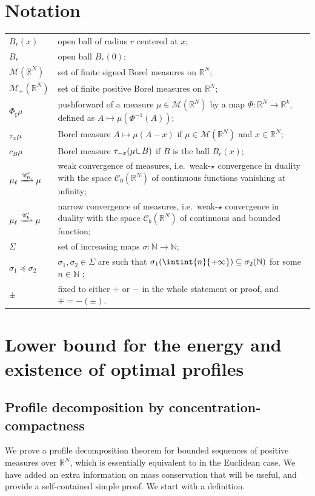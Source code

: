 \documentclass[11pt]{article}
\providecommand{\ie}{i.e.\ }
\theoremstyle{plain}
\theoremstyle{definition}
\newcommand{\N}{\mathbb{N}}
\newcommand{\R}{\mathbb{R}}
\newcommand{\Cspace}{\mathscr{C}}
\newcommand{\Mspace}{\mathscr{M}}
\newcommand{\mres}{\mathop{\hbox{\vrule height 6pt width .5pt depth 0pt \vrule height .5pt width 4pt depth 0pt}}\nolimits}
\newcommand{\mweakto}{\xrightharpoonup{\Cspace_0'}}
\newcommand{\narrowto}{\xrightharpoonup{\Cspace_b'}}
\numberwithin{equation}{section}
\begin{document}
\section*{Notation}
\begin{tabu} {X[2,c,m] X[12,l,p]}
\(B_r(x)\) & open ball of radius \(r\) centered at \(x\);\\
\(B_r\) & open ball $B_r(0)$;\\
\(\Mspace(\R^N)\) & set of finite signed Borel measures on \(\R^N\);\\
\(\Mspace_+(\R^N)\) & set of finite positive Borel measures on \(\R^N\);\\
$\Phi_\sharp\mu$ & pushforward of a measure $\mu\in\Mspace(\R^N)$ by a map $\Phi:\R^N\to\R^k$, defined as $A\mapsto \mu(\Phi^{-1}(A))$;\\
$\tau_x\mu$ & Borel measure $A \mapsto \mu(A-x)$ if \(\mu\in\Mspace(\R^N)\) and $x\in \R^N$;\\
$c_B \mu$ & Borel measure $\tau_{-x} (\mu \mres B)$ if $B$ is the ball $B_r(x)$;\\
$\mu_\ell \mweakto \mu$ & weak convergence of measures, \ie weak-$\star$ convergence in duality with the space $\Cspace_0(\R^N)$ of continuous functions vanishing at infinity;\\
$\mu_\ell \narrowto \mu$ & narrow convergence of measures, \ie weak-$\star$ convergence in duality with the space $\Cspace_b(\R^N)$ of continuous and bounded function;\\
$\Sigma$ & set of increasing maps $\sigma : \N \to \N$;\\
$\sigma_1 \preceq \sigma_2$ & $\sigma_1, \sigma_2 \in \Sigma$ are such that $\sigma_1(\intint{n}{+\infty}) \subseteq \sigma_2(\N)$ for some $n\in \N$ ;\\
$\pm$ & fixed to either $+$ or $-$ in the whole statement or proof, and $\mp = -(\pm)$.
\end{tabu}
\setcounter{section}{2}
\section{Lower bound for the energy and existence of optimal profiles}\label{sectionLowerBound}
\subsection{Profile decomposition by concentration-compactness}

We prove a profile decomposition theorem for bounded sequences of positive measures over $\R^N$, which is essentially equivalent to \cite[Th.\,1.5]{marisProfileDecompositionSequences2014} in the Euclidean case. We have added an extra information on mass conservation that will be useful, and provide a self-contained simple proof. We start with a definition.
\end{document}
